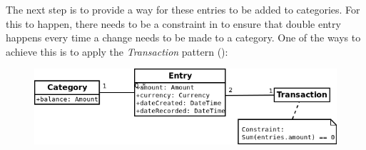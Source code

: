 The next step is to provide a way for these entries to be added to categories.
For this to happen, there needs to be a constraint in to ensure that double
entry happens every time a change needs to be made to a category. One of the
ways to achieve this is to apply the \emph{Transaction} pattern (\cite[][Section~6.2]{fowler1997analysis}):
\begin{figure}[ht!]
  \begin{center}
    \includegraphics[width=14cm]{./contents/img/Class_Diagram_-_Transaction.png}
  \end{center}
\end{figure}
\FloatBarrier
